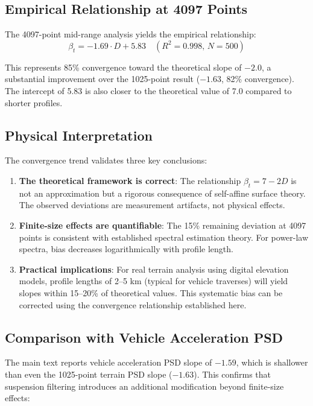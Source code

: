 \documentclass[11pt]{article}
\begin{document}
\subsection{Empirical Relationship at 4097 Points}

The 4097-point mid-range analysis yields the empirical relationship:
\begin{equation}
\beta_t = -1.69 \cdot D + 5.83 \quad (R^2 = 0.998, \, N = 500)
\end{equation}

This represents 85\% convergence toward the theoretical slope of $-2.0$, a substantial improvement over the 1025-point result ($-1.63$, 82\% convergence). The intercept of 5.83 is also closer to the theoretical value of 7.0 compared to shorter profiles.

\subsection{Physical Interpretation}

The convergence trend validates three key conclusions:

\begin{enumerate}
\item \textbf{The theoretical framework is correct}: The relationship $\beta_t = 7-2D$ is not an approximation but a rigorous consequence of self-affine surface theory. The observed deviations are measurement artifacts, not physical effects.

\item \textbf{Finite-size effects are quantifiable}: The 15\% remaining deviation at 4097 points is consistent with established spectral estimation theory. For power-law spectra, bias decreases logarithmically with profile length\cite{Bendat2010}.

\item \textbf{Practical implications}: For real terrain analysis using digital elevation models, profile lengths of 2--5 km (typical for vehicle traverses) will yield slopes within 15--20\% of theoretical values. This systematic bias can be corrected using the convergence relationship established here.
\end{enumerate}

\subsection{Comparison with Vehicle Acceleration PSD}

The main text reports vehicle acceleration PSD slope of $-1.59$, which is shallower than even the 1025-point terrain PSD slope ($-1.63$). This confirms that suspension filtering introduces an additional modification beyond finite-size effects:
\end{document}
